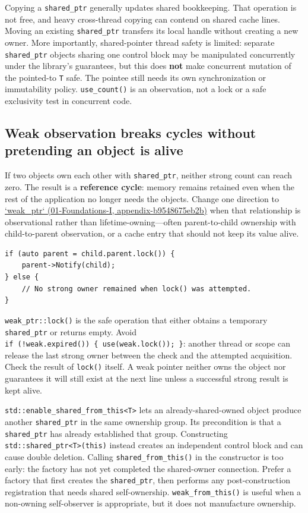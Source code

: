 Copying a \texttt{shared\_ptr} generally updates shared bookkeeping. That operation is not free, and heavy cross-thread copying can contend on shared cache lines. Moving an existing \texttt{shared\_ptr} transfers its local handle without creating a new owner. More importantly, shared-pointer thread safety is limited: separate \texttt{shared\_ptr} objects sharing one control block may be manipulated concurrently under the library's guarantees, but this does \textbf{not} make concurrent mutation of the pointed-to \texttt{T} safe. The pointee still needs its own synchronization or immutability policy. \texttt{use\_count()} is an observation, not a lock or a safe exclusivity test in concurrent code.

\subsection{Weak observation breaks cycles without pretending an object is alive}\label{05-engine-i-ch004-weak-observation-breaks-cycles-without-pretending-an-object-is-alive}

If two objects own each other with \texttt{shared\_ptr}, neither strong count can reach zero. The result is a \textbf{reference cycle}: memory remains retained even when the rest of the application no longer needs the objects. Change one direction to \href{../01-Foundations-I/main.pdf\#nameddest=appendix-b9548675eb2b}{`weak\_ptr` (01-Foundations-I, appendix-b9548675eb2b)} when that relationship is observational rather than lifetime-owning---often parent-to-child ownership with child-to-parent observation, or a cache entry that should not keep its value alive.

\begin{verbatim}
if (auto parent = child.parent.lock()) {
    parent->Notify(child);
} else {
    // No strong owner remained when lock() was attempted.
}
\end{verbatim}

\texttt{weak\_ptr::lock()} is the safe operation that either obtains a temporary \texttt{shared\_ptr} or returns empty. Avoid \texttt{if\ (!weak.expired())\ \{\ use(weak.lock());\ \}}: another thread or scope can release the last strong owner between the check and the attempted acquisition. Check the result of \texttt{lock()} itself. A weak pointer neither owns the object nor guarantees it will still exist at the next line unless a successful strong result is kept alive.

\texttt{std::enable\_shared\_from\_this\textless{}T\textgreater{}} lets an already-shared-owned object produce another \texttt{shared\_ptr} in the same ownership group. Its precondition is that a \texttt{shared\_ptr} has already established that group. Constructing \texttt{std::shared\_ptr\textless{}T\textgreater{}(this)} instead creates an independent control block and can cause double deletion. Calling \texttt{shared\_from\_this()} in the constructor is too early: the factory has not yet completed the shared-owner connection. Prefer a factory that first creates the \texttt{shared\_ptr}, then performs any post-construction registration that needs shared self-ownership. \texttt{weak\_from\_this()} is useful when a non-owning self-observer is appropriate, but it does not manufacture ownership.

